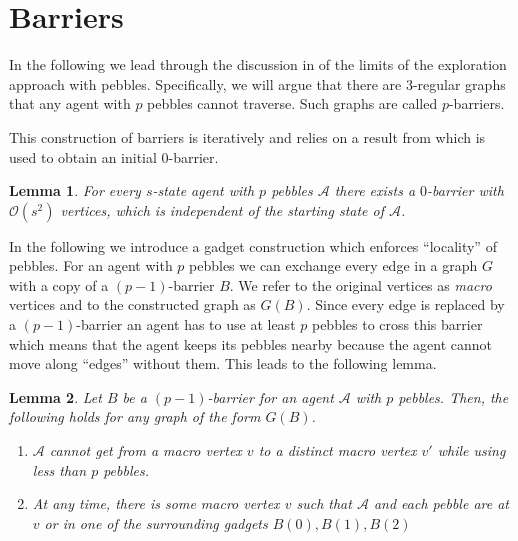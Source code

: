 \documentclass[oneside]{scrartcl}
\newtheorem{lem}{Lemma}
\begin{document}
\section{Barriers}
In the following we lead through the discussion in \cite{pebbles} of the limits
of the exploration approach with pebbles. Specifically, we will argue that
there are 3-regular graphs that any agent with $p$ pebbles cannot traverse.
Such graphs are called $p$-barriers.

This construction of barriers is iteratively and relies on a result from
\cite{0barrier} which is used to obtain an initial $0$-barrier.
\begin{lem}
  \label{lem:0bar}
  For every $s$-state agent with $p$ pebbles $\mathcal{A}$ there exists a
  $0$-barrier with $\mathcal{O}(s^{2})$ vertices, which is independent of
  the starting state of $\mathcal{A}$.
\end{lem}

In the following we introduce a gadget construction which enforces
\enquote{locality} of pebbles. For an agent with $p$ pebbles we can exchange
every edge in a graph $G$ with a copy of a $(p-1)$-barrier $B$. We refer to the
original vertices as \emph{macro} vertices and to the constructed graph as
$G(B)$.  Since every edge is replaced by a $(p-1)$-barrier an agent has to use
at least $p$ pebbles to cross this barrier which means that the agent keeps its
pebbles nearby because the agent cannot move along \enquote{edges} without
them.  This leads to the following lemma.
\begin{lem}
  \label{lem:loc}
  Let $B$ be a $(p-1)$-barrier for an agent $\mathcal{A}$ with $p$ pebbles.
  Then, the following holds for any graph of the form $G(B)$.
  \begin{enumerate}
    \item $\mathcal{A}$ cannot get from a macro vertex $v$ to a distinct
      macro vertex $v'$ while using less than $p$ pebbles.
    \item At any time, there is some macro vertex $v$ such that $\mathcal{A}$
      and each pebble are at $v$ or in one of the surrounding gadgets $B(0),
      B(1), B(2)$
  \end{enumerate}
\end{lem}
\end{document}
